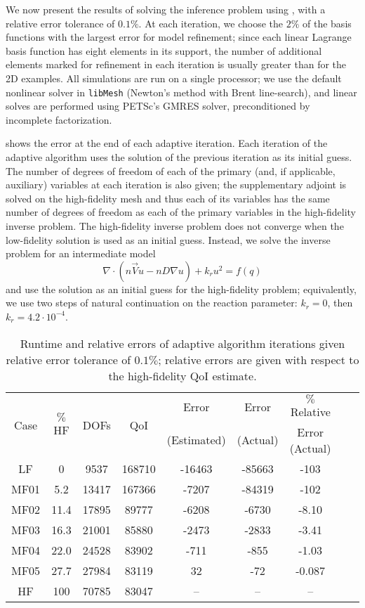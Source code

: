 We now present the results of solving the inference problem using , with a relative error tolerance of $0.1\%$. At each iteration, we choose the $2\%$ of the basis functions with the largest error for model refinement; since each linear Lagrange basis function has eight elements in its support, the number of additional elements marked for refinement in each iteration is usually greater than for the 2D examples. All simulations are run on a single processor; we use the default nonlinear solver in \texttt{libMesh} \cite{libMeshPaper} (Newton's method with Brent line-search), and linear solves are performed using PETSc's \cite{petsc-user-ref} GMRES solver, preconditioned by incomplete factorization.

 shows the error at the end of each adaptive iteration. Each iteration of the adaptive algorithm uses the solution of the previous iteration as its initial guess. The number of degrees of freedom of each of the primary (and, if applicable, auxiliary) variables at each iteration is also given; the supplementary adjoint is solved on the high-fidelity mesh and thus each of its variables has the same number of degrees of freedom as each of the primary variables in the high-fidelity inverse problem. The high-fidelity inverse problem does not converge when the low-fidelity solution is used as an initial guess. Instead, we solve the inverse problem for an intermediate model
%
\begin{equation}
\nabla\cdot(n\vec{V}u - nD\nabla u) + k_ru^2 = f(q)
\end{equation}
%
and use the solution as an initial guess for the high-fidelity problem; equivalently, we use two steps of natural continuation on the reaction parameter: $k_r=0$, then $k_r=4.2\cdot10^{-4}$.
%
\begin{table}[htbp]
\centering
\begin{tabular}{|c|c|c|c|c|c|c|c|c|}
\hline
\multirow{2}{*}{Case} & \multirow{2}{*}{$\%$HF} & \multirow{2}{*}{DOFs} & \multirow{2}{*}{QoI} & Error & Error & $\%$ Relative \\
& & & & (Estimated) & (Actual) & Error (Actual)  \\ \hline
LF   & 0    & 9537  & 168710 & -16463 & -85663 & -103    \\
MF01 & 5.2  & 13417 & 167366 & -7207  & -84319 & -102    \\
MF02 & 11.4 & 17895 & 89777  & -6208  & -6730  & -8.10   \\
MF03 & 16.3 & 21001 & 85880  & -2473  & -2833  & -3.41   \\
MF04 & 22.0 & 24528 & 83902  & -711   & -855   & -1.03   \\
MF05 & 27.7 & 27984 & 83119  & 32     & -72    & -0.087  \\
HF   & 100  & 70785 & 83047  & --     & --     & --    \\ \hline
\end{tabular}
\caption{Runtime and relative errors of adaptive algorithm iterations given relative error tolerance of $0.1\%$; relative errors are given with respect to the high-fidelity QoI estimate.}
\label{tab:ref3D_diffmesh}
\end{table}
%

